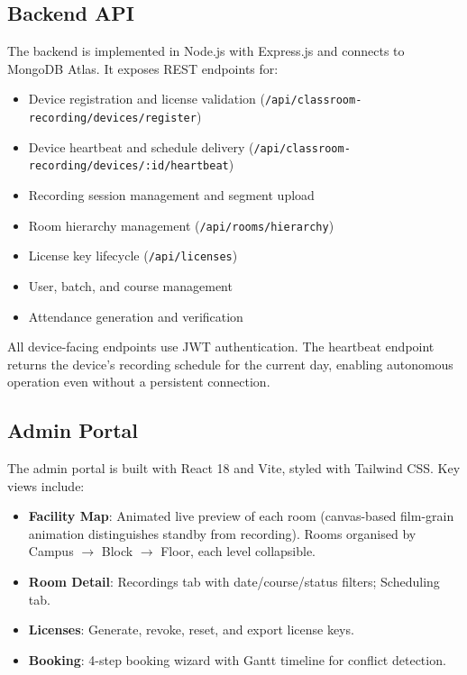 \documentclass[12pt,a4paper]{article}
\begin{document}
\subsection{Backend API}

The backend is implemented in Node.js with Express.js and connects to MongoDB Atlas. It exposes REST endpoints for:

\begin{itemize}
    \item Device registration and license validation (\texttt{/api/classroom-recording/devices/register})
    \item Device heartbeat and schedule delivery (\texttt{/api/classroom-recording/devices/:id/heartbeat})
    \item Recording session management and segment upload
    \item Room hierarchy management (\texttt{/api/rooms/hierarchy})
    \item License key lifecycle (\texttt{/api/licenses})
    \item User, batch, and course management
    \item Attendance generation and verification
\end{itemize}

All device-facing endpoints use JWT authentication. The heartbeat endpoint returns the device's recording schedule for the current day, enabling autonomous operation even without a persistent connection.

\subsection{Admin Portal}

The admin portal is built with React 18 and Vite, styled with Tailwind CSS. Key views include:

\begin{itemize}
    \item \textbf{Facility Map}: Animated live preview of each room (canvas-based film-grain animation distinguishes standby from recording). Rooms organised by Campus $\rightarrow$ Block $\rightarrow$ Floor, each level collapsible.
    \item \textbf{Room Detail}: Recordings tab with date/course/status filters; Scheduling tab.
    \item \textbf{Licenses}: Generate, revoke, reset, and export license keys.
    \item \textbf{Booking}: 4-step booking wizard with Gantt timeline for conflict detection.
\end{itemize}
\end{document}
